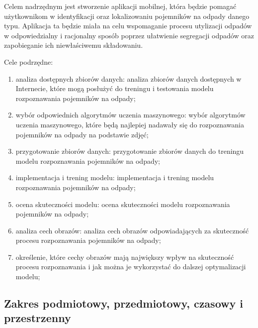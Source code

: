 \documentclass[12pt,oneside]{book}
\begin{document}
Celem nadrzędnym jest stworzenie aplikacji mobilnej, która będzie pomagać użytkownikom w identyfikacji oraz lokalizowaniu pojemników na odpady danego typu. Aplikacja ta będzie miała na celu wspomaganie procesu utylizacji odpadów w odpowiedzialny i racjonalny sposób poprzez ułatwienie segregacji odpadów oraz zapobieganie ich niewłaściwemu składowaniu.

Cele podrzędne:

\begin{enumerate}[label=--]
    \item analiza dostępnych zbiorów danych: analiza zbiorów danych dostępnych w Internecie, które mogą posłużyć do treningu i testowania modelu rozpoznawania pojemników na odpady;
    \item wybór odpowiednich algorytmów uczenia maszynowego: wybór algorytmów uczenia maszynowego, które będą najlepiej nadawały się do rozpoznawania pojemników na odpady na podstawie zdjęć;
    \item przygotowanie zbiorów danych: przygotowanie zbiorów danych do treningu modelu rozpoznawania pojemników na odpady;
    \item implementacja i trening modelu: implementacja i trening modelu rozpoznawania pojemników na odpady;
    \item ocena skuteczności modelu: ocena skuteczności modelu rozpoznawania pojemników na odpady;
    \item analiza cech obrazów: analiza cech obrazów odpowiadających za skuteczność procesu rozpoznawania pojemników na odpady;
    \item określenie, które cechy obrazów mają największy wpływ na skuteczność procesu rozpoznawania i jak można je wykorzystać do dalszej optymalizacji modelu;
\end{enumerate}


\subsection{Zakres podmiotowy, przedmiotowy, czasowy i przestrzenny}
\end{document}
